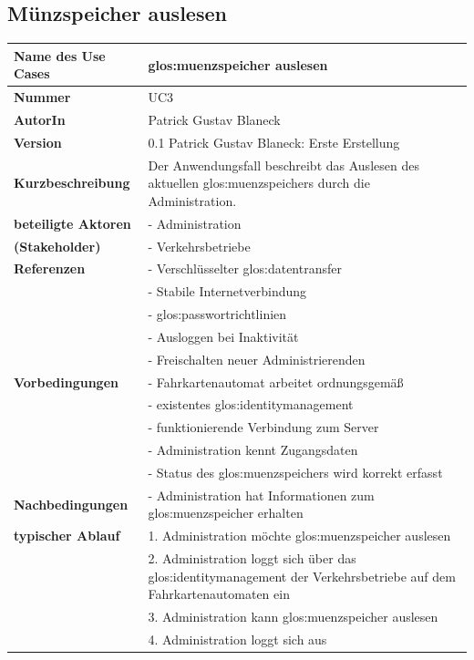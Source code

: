 \documentclass{lastenheft}
\begin{document}
\subsection{Münzspeicher auslesen}

\begin{xltabular}{\linewidth}{|>{\bfseries}p{4cm}|X|}
    \hline
    Name des Use Cases & \gls{glos:muenzspeicher} auslesen \\
    \hline
    Nummer & UC3 \\
    \hline
    AutorIn & Patrick Gustav Blaneck \\
    \hline
    Version & 0.1 Patrick Gustav Blaneck: Erste Erstellung \\
    \hline
    Kurzbeschreibung & Der Anwendungsfall beschreibt das Auslesen des aktuellen \gls{glos:muenzspeicher}s durch die Administration.\\
    \hline
    beteiligte Aktoren & - Administration \\
    (Stakeholder) & - Verkehrsbetriebe \\
    \hline
    Referenzen & - Verschlüsselter \gls{glos:datentransfer} \\
    & - Stabile Internetverbindung \\
    & - \gls{glos:passwortrichtlinie}n \\
    & - Ausloggen bei Inaktivität \\
    & - Freischalten neuer Administrierenden \\
    \hline
    Vorbedingungen & - Fahrkartenautomat arbeitet ordnungsgemäß \\
    & - existentes \gls{glos:identitymanagement} \\
    & - funktionierende Verbindung zum Server \\
    & - Administration kennt Zugangsdaten \\
    & - Status des \gls{glos:muenzspeicher}s wird korrekt erfasst \\
    \hline
    Nachbedingungen & - Administration hat Informationen zum \gls{glos:muenzspeicher} erhalten \\
    \hline
    typischer Ablauf & 1. Administration möchte \gls{glos:muenzspeicher} auslesen \\
    & 2. Administration loggt sich über das \gls{glos:identitymanagement} der Verkehrsbetriebe auf dem Fahrkartenautomaten ein \\
    & 3. Administration kann \gls{glos:muenzspeicher} auslesen \\
    & 4. Administration loggt sich aus \\

\end{xltabular}
\end{document}
